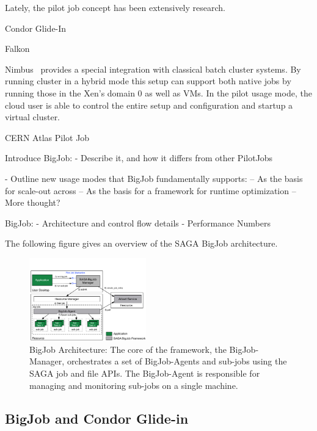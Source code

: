 \documentclass[conference,final]{IEEEtran}
\begin{document}

Lately, the pilot job concept has been extensively research.

Condor Glide-In~\cite{citeulike:291860}

Falkon~\cite{1362680}


Nimbus~\cite{10.1109/MIC.2009.94} provides a special integration with
classical batch cluster systems. By running cluster in a hybrid mode
this setup can support both native jobs by running those in the Xen's
domain 0 as well as VMs. In the pilot usage mode, the cloud user is
able to control the entire setup and configuration and startup a
virtual cluster.


CERN Atlas Pilot Job~\cite{1555338}


Introduce BigJob:
 - Describe it, and how it differs from other PilotJobs

 - Outline new usage modes that BigJob fundamentally supports:
    -- As the basis for scale-out across
    -- As the basis for a framework for runtime optimization
    -- More thought?

BigJob:
 - Architecture and control flow details
 - Performance Numbers


The following figure gives an overview of the SAGA BigJob architecture.

\begin{figure}[htbp]
    \centering
    \includegraphics[width=0.45\textwidth]{figures/bigjob}
    \caption{BigJob Architecture: The core of the framework, the BigJob-Manager,
     orchestrates a set of BigJob-Agents and sub-jobs using the SAGA job and file APIs. 
     The BigJob-Agent is responsible for managing and monitoring sub-jobs on a 
     single machine.}
    \label{fig:figures_bigjob}
\end{figure}


\subsection{BigJob and Condor Glide-in}
\end{document}
